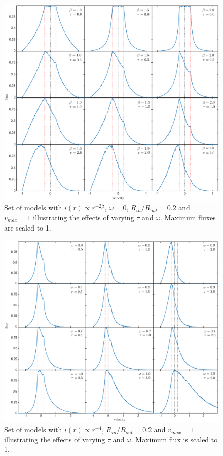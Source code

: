\documentclass[useAMS,usenatbib,usegraphicx]{mnras}
\begin{document}
\begin{figure}
\includegraphics[trim =80 10 6 15,clip=true,scale=0.515]{params/D/newDall} 
\caption{Set of models with $i(r) \propto r^{-2\beta}$, $\omega=0$, 
$R_{in}/R_{out}=0.2$ and $v_{max}=1$ illustrating the effects of varying 
$\tau$ and $\omega$.  Maximum fluxes are scaled to 1.}
\label{bt}
\end{figure}

\begin{figure}
\includegraphics[trim =80 10 40 15,clip=true,scale=0.515]{params/C/C_all} 
\caption{Set of models with $i(r) \propto r^{-4}$, $R_{in}/R_{out}=0.2$ 
and $v_{max}=1$ illustrating the effects of varying $\tau$ and $\omega$. 
Maximum flux is scaled to 1. }
\label{wt}
\end{figure}
\end{document}
